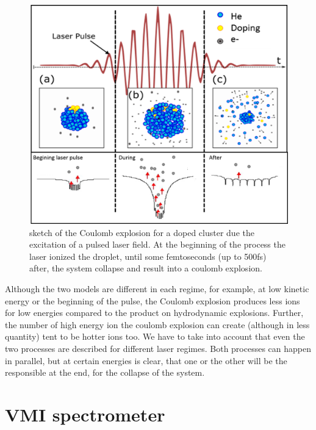 \begin{figure}[h!]
\centering
\includegraphics[width=14cm]{../Images/cluster_regimes_2.png}
\caption{sketch of the Coulomb explosion for a doped cluster due the excitation of a pulsed laser field. At the beginning of the process the laser ionized the droplet, until some femtoseconds (up to 500fs) after, the system collapse and result into a coulomb explosion.}
\label{fig:columbexplosion}

\end{figure}


Although the two models are different in each regime, for example, at low kinetic energy or the beginning of the pulse, the Coulomb explosion produces less ions for low energies compared to the product on hydrodynamic explosions. Further, the number of high energy ion the coulomb explosion can create (although in less quantity) tent to be hotter ions too.
We have to take into account that even the two processes are described for different laser regimes. Both processes can happen in parallel, but at certain energies is clear, that one or the other will be the responsible at the end, for the collapse of the system.

\section{VMI spectrometer}

